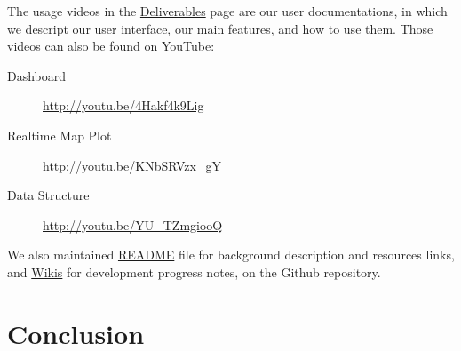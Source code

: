 \documentclass[paper=a4, fontsize=11pt]{report} %
\begin{document}
The usage videos in the \href{http://sjengle.cs.usfca.edu/cs690-sonicwall/deliverables.html}{Deliverables} page are our user documentations, in which we descript our user interface, our main features, and how to use them.
Those videos can also be found on YouTube:

\begin{description}
    \item[Dashboard] \url{http://youtu.be/4Hakf4k9Lig}
    \item[Realtime Map Plot] \url{http://youtu.be/KNbSRVzx_gY}
    \item[Data Structure] \url{http://youtu.be/YU_TZmgiooQ}
\end{description}

We also maintained \href{https://github.com/sjengle/cs690-sonicwall}{README} file for background description and resources links, and \href{https://github.com/sjengle/cs690-sonicwall/wiki}{Wikis} for development progress notes, on the Github repository.




\chapter{Conclusion} %
\label{cha:conclusion}



\end{document}
